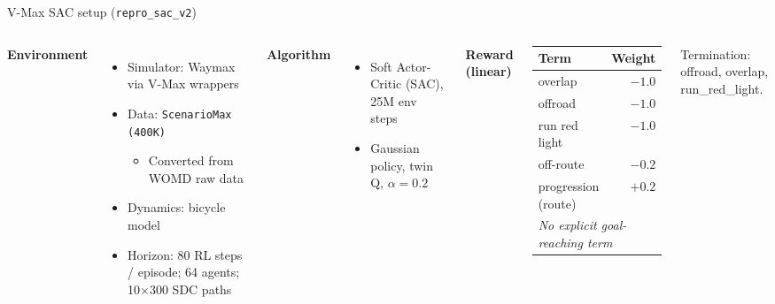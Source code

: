 \begin{frame}{V-Max SAC setup (\texttt{repro\_sac\_v2})}
  \begin{columns}[T]
    \textbf{Environment}
    \begin{itemize}
      \item Simulator: Waymax via V-Max wrappers
      \item Data: \texttt{ScenarioMax (400K)}
        \begin{itemize}
            \item Converted from WOMD raw data
        \end{itemize}
      \item Dynamics: bicycle model
      \item Horizon: 80 RL steps / episode; 64 agents; 10$\times$300 SDC paths
    \end{itemize}

    \vspace{0.5em}
    \textbf{Algorithm}
    \begin{itemize}
      \item Soft Actor-Critic (SAC), 25M env steps
      \item Gaussian policy, twin Q, $\alpha{=}0.2$
    \end{itemize}

    \textbf{Reward (linear)}
    \begin{center}
      \begin{tabular}{@{}lr@{}}
        \toprule
        Term & Weight \\
        \midrule
        overlap & $-1.0$ \\
        offroad & $-1.0$ \\
        run red light & $-1.0$ \\
        off-route & $-0.2$ \\
        progression (route) & $+0.2$ \\
        \midrule
        \multicolumn{2}{l}{\emph{No explicit goal-reaching term}} \\
        \bottomrule
      \end{tabular}
    \end{center}

    Termination: offroad, overlap, run\_red\_light.
  \end{columns}
\end{frame}

